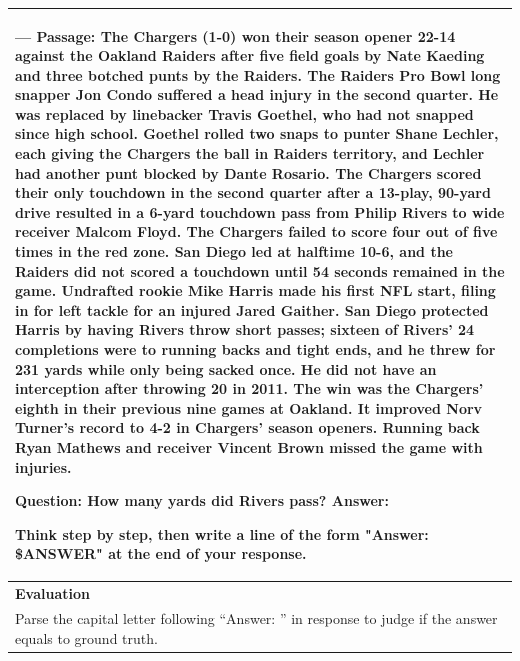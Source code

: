 \begin{table}[h]
\begin{tabular}{p{}}
---
Passage:  The Chargers (1-0) won their season opener 22-14 against the Oakland Raiders after five field goals by Nate Kaeding and three botched punts by the Raiders. The Raiders Pro Bowl long snapper Jon Condo suffered a head injury in the second quarter. He was replaced by linebacker Travis Goethel, who had not snapped since high school. Goethel rolled two snaps to punter Shane Lechler, each giving the Chargers the ball in Raiders territory, and Lechler had another punt blocked by Dante Rosario. The Chargers scored their only touchdown in the second quarter after a 13-play, 90-yard drive resulted in a 6-yard touchdown pass from Philip Rivers to wide receiver Malcom Floyd. The Chargers failed to score four out of five times in the red zone. San Diego led at halftime 10-6, and the Raiders did not scored a touchdown until 54 seconds remained in the game. Undrafted rookie Mike Harris made his first NFL start, filing in for left tackle for an injured Jared Gaither. San Diego protected Harris by having Rivers throw short passes; sixteen of Rivers' 24 completions were to running backs and tight ends, and he threw for 231 yards while only being sacked once. He did not have an interception after throwing 20 in 2011. The win was the Chargers' eighth in their previous nine games at Oakland. It improved Norv Turner's record to 4-2 in Chargers' season openers. Running back Ryan Mathews and receiver Vincent Brown missed the game with injuries.

Question: How many yards did Rivers pass?
Answer: 

Think step by step, then write a line of the form "Answer: \$ANSWER" at the end of your response. \\ \hline
      \textbf{Evaluation}\\
      Parse the capital letter following ``Answer: '' in response to judge if the answer equals to ground truth. \\ \hline
    \end{tabular}
\end{table}

